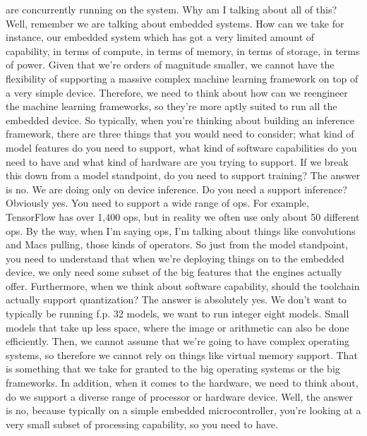     are concurrently running on the system.
    Why am I talking about all of this?
    Well, remember we are talking about embedded systems.
    How can we take for instance, our embedded system which
    has got a very limited amount of capability, in terms of compute,
    in terms of memory, in terms of storage, in terms of power.
    Given that we're orders of magnitude smaller,
    we cannot have the flexibility of supporting a massive complex machine
    learning framework on top of a very simple device.
    Therefore, we need to think about how can we
    reengineer the machine learning frameworks,
    so they're more aptly suited to run all the embedded device.
    So typically, when you're thinking about building an inference framework,
    there are three things that you would need to consider;
    what kind of model features do you need to support,
    what kind of software capabilities do you need to have
    and what kind of hardware are you trying to support.
    If we break this down from a model standpoint,
    do you need to support training?
    The answer is no.
    We are doing only on device inference.
    Do you need a support inference?
    Obviously yes.
    You need to support a wide range of ops.
    For example, TensorFlow has over 1,400 ops,
    but in reality we often use only about 50 different ops.
    By the way, when I'm saying ops, I'm talking about things like convolutions
    and Macs pulling, those kinds of operators.
    So just from the model standpoint, you need
    to understand that when we're deploying things on to the embedded device,
    we only need some subset of the big features
    that the engines actually offer.
    Furthermore, when we think about software capability,
    should the toolchain actually support quantization?
    The answer is absolutely yes.
    We don't want to typically be running f.p.
    32 models, we want to run integer eight models.
    Small models that take up less space, where the image or arithmetic can also
    be done efficiently.
    Then, we cannot assume that we're going to have complex operating systems,
    so therefore we cannot rely on things like virtual memory support.
    That is something that we take for granted to the big operating
    systems or the big frameworks.
    In addition, when it comes to the hardware, we need to think about,
    do we support a diverse range of processor or hardware device.
    Well, the answer is no, because typically
    on a simple embedded microcontroller, you're
    looking at a very small subset of processing capability,
    so you need to have.
